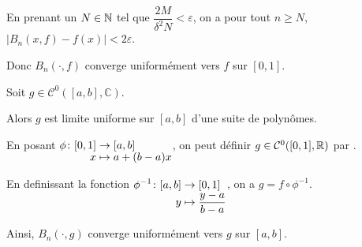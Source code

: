 \documentclass[a4paper, 12pt]{article}
\begin{document}
\begin{demonstration}
    En prenant un $N \in \mathbb{N}$ tel que $\dfrac{2M}{\delta^2 N} < \varepsilon$, on a pour tout $n \geq N$, $|B_n(x, f) - f(x)| < 2\varepsilon$.

    Donc $B_n(\cdot, f)$ converge uniformément vers $f$ sur $[0, 1]$.
\end{demonstration}

\begin{corollaire}{}{}
    Soit $g \in \mathcal{C}^0([a, b], \mathbb{C})$.

    Alors $g$ est limite uniforme sur $[a, b]$ d'une suite de polynômes.
\end{corollaire}

\begin{demonstration}
    En posant $\funcdef{\phi}{[0, 1]}{[a, b]}{x}{a + (b - a)x}$, on peut définir $g \in \mathcal{C}^0([0, 1], \mathbb{R})$ par .

    En definissant la fonction $\funcdef{\phi^{-1}}{[a, b]}{[0, 1]}{y}{\frac{y - a}{b - a}}$, on a $g = f \circ \phi^{-1}$.

    Ainsi, $B_n(\cdot, g)$ converge uniformément vers $g$ sur $[a, b]$.
\end{demonstration}
\end{document}
